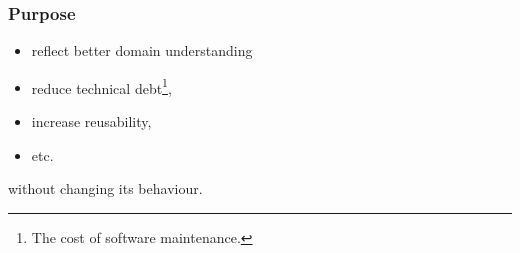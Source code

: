 \begin{frame}

\frametitle{Purpose}

\vspace{\fill}

\begin{itemize}

\item reflect better domain understanding

\item reduce technical debt\footnote{The cost of software maintenance.},

\item increase reusability,

\item etc.

\end{itemize}

\begin{center}

without changing its behaviour.

\end{center}

\vspace{\fill}

\end{frame}
